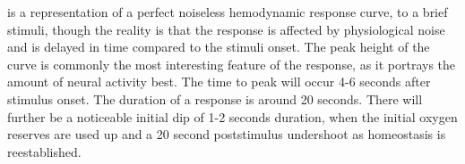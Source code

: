  is a representation of a perfect noiseless hemodynamic response curve, to a brief stimuli, though the reality is that the response is affected by physiological noise and is delayed in time compared to the stimuli onset. The peak height of the curve is commonly the most interesting feature of the response, as it portrays the amount of neural activity best. The time to peak will occur 4-6 seconds after stimulus onset. The duration of a response is around 20 seconds. There will further be a noticeable initial dip of 1-2 seconds duration, when the initial oxygen reserves are used up and a 20 second poststimulus undershoot as homeostasis is reestablished. \cite{Poldrack2011}   